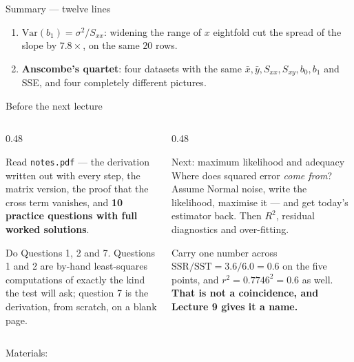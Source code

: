 \documentclass[aspectratio=169]{beamer}
\begin{document}
\begin{frame}[shrink=15]{Summary --- twelve lines}
\begin{enumerate}
      to match one division, and on diabetes reproduced
      $(X^{\!\top}\!X)^{-1}X^{\!\top}y$ to $4\times10^{-16}$ relative.
      Stochastic descent stopped $6.1\%$ short.
    \item $\mathrm{Var}(b_1) = \sigma^2/S_{xx}$: widening the range of $x$
      eightfold cut the spread of the slope by $7.8\times$, on the same $20$
      rows.
    \item \textbf{Anscombe's quartet}: four datasets with the same
      $\bar x, \bar y, S_{xx}, S_{xy}, b_0, b_1$ and SSE, and four completely
      different pictures.
  \end{enumerate}
\end{frame}

\begin{frame}[shrink=3]{Before the next lecture}
  \begin{columns}[T]
    \begin{column}{0.48\textwidth}
      \begin{block}{Read}
        \texttt{notes.pdf} --- the derivation written out with every step,
        the matrix version, the proof that the cross term vanishes, and
        \textbf{10 practice questions with full worked solutions}.
      \end{block}
      \begin{block}{Do}
        Questions 1, 2 and 7. Questions 1 and 2 are by-hand least-squares
        computations of exactly the kind the test will ask; question 7 is
        the derivation, from scratch, on a blank page.
      \end{block}
    \end{column}
    \begin{column}{0.48\textwidth}
      \begin{exampleblock}{Next: maximum likelihood and adequacy}
        Where does squared error \emph{come from}? Assume Normal noise, write
        the likelihood, maximise it --- and get today's estimator back.
        Then $R^2$, residual diagnostics and over-fitting.
      \end{exampleblock}
      \begin{alertblock}{Carry one number across}
        $\mathrm{SSR}/\mathrm{SST} = 3.6/6.0 = 0.6$ on the five points, and
        $r^2 = 0.7746^2 = 0.6$ as well. \textbf{That is not a coincidence,
        and Lecture 9 gives it a name.}
      \end{alertblock}
    \end{column}
  \end{columns}
  \begin{center}
    \small Materials: \texttt{\AMLRepoURL}
  \end{center}
  \slidesources{\AMLUnitVSources}
\end{frame}
\end{document}
